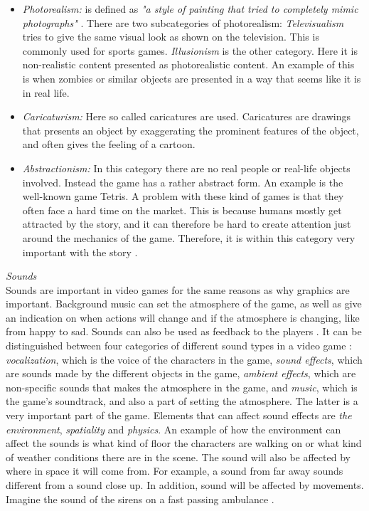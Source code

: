 \begin{itemize}
\item \emph{Photorealism:} is defined as \emph{"a style of painting that tried to completely mimic photographs"} \cite{understandingvg}. There are two subcategories of photorealism: \emph{Televisualism} tries to give the same visual look as shown on the television. This is commonly used for sports games. \emph{Illusionism} is the other category. Here it is non-realistic content presented as photorealistic content. An example of this is when zombies or similar objects are presented in a way that seems like it is in real life.  
\item \emph{Caricaturism:} Here so called caricatures are used. Caricatures are drawings that presents an object by exaggerating the prominent features of the object, and often gives the feeling of a cartoon. 
\item \emph{Abstractionism:} In this category there are no real people or real-life objects involved. Instead  the game has a rather abstract form. An example is the well-known game Tetris. A problem with these kind of games is that they often face a hard time on the market. This is because humans mostly get attracted by the story, and it can therefore be hard to create attention just around the mechanics of the game. Therefore, it is within this category very important with the story \cite{understandingvg}. 
\end{itemize}

\emph{Sounds}\\
Sounds are important in video games for the same reasons as why graphics are important. Background music can set the atmosphere of the game, as well as give an indication on when actions will change and if the atmosphere is changing, like from happy to sad. Sounds can also be used as feedback to the players \cite{umlapproach}. It can be distinguished between four categories of different sound types in a video game \cite{understandingvg}:
\emph{vocalization}, which is the voice of the characters in the game,
\emph{sound effects}, which are sounds made by the different objects in the game, \emph{ambient effects}, which are non-specific sounds that makes the atmosphere in the game, and \emph{music}, which is the game's soundtrack, and also a part of setting the atmosphere. The latter is a very important part of the game. Elements that can affect sound effects are \emph{the environment}, \emph{spatiality} and \emph{physics}. An example of how the environment can affect the sounds is what kind of floor the characters are walking on or what kind of weather conditions there are in the scene. The sound will also be affected by where in space it will come from. For example, a sound from far away sounds different from a sound close up. In addition, sound will be affected by movements. Imagine the sound of the sirens on a fast passing ambulance \cite{understandingvg}.

